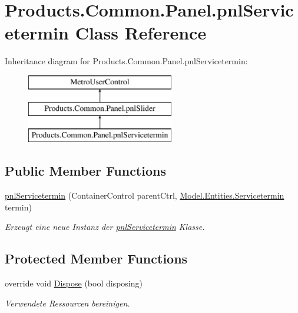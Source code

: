 \hypertarget{class_products_1_1_common_1_1_panel_1_1pnl_servicetermin}{}\section{Products.\+Common.\+Panel.\+pnl\+Servicetermin Class Reference}
\label{class_products_1_1_common_1_1_panel_1_1pnl_servicetermin}
Inheritance diagram for Products.\+Common.\+Panel.\+pnl\+Servicetermin\+:\begin{figure}[H]
\begin{center}
\leavevmode
\includegraphics[height=3.000000cm]{class_products_1_1_common_1_1_panel_1_1pnl_servicetermin}
\end{center}
\end{figure}
\subsection*{Public Member Functions}
\begin{DoxyCompactItemize}
\item 
\hyperlink{class_products_1_1_common_1_1_panel_1_1pnl_servicetermin_a387cea8c796130cdfc077dc711c7de68}{pnl\+Servicetermin} (Container\+Control parent\+Ctrl, \hyperlink{class_products_1_1_model_1_1_entities_1_1_servicetermin}{Model.\+Entities.\+Servicetermin} termin)
\begin{DoxyCompactList}\small\item\em Erzeugt eine neue Instanz der \hyperlink{class_products_1_1_common_1_1_panel_1_1pnl_servicetermin}{pnl\+Servicetermin} Klasse. \end{DoxyCompactList}\end{DoxyCompactItemize}
\subsection*{Protected Member Functions}
\begin{DoxyCompactItemize}
\item 
override void \hyperlink{class_products_1_1_common_1_1_panel_1_1pnl_servicetermin_a1c12d2ff285f451e713035e21a54462f}{Dispose} (bool disposing)
\begin{DoxyCompactList}\small\item\em Verwendete Ressourcen bereinigen. \end{DoxyCompactList}\end{DoxyCompactItemize}
